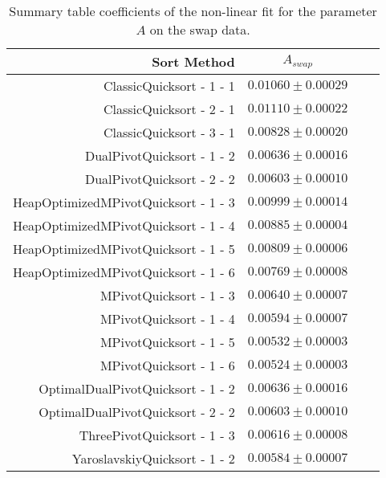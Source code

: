 


		\begin{table}
			\begin{center}
				\begin{tabular}{|r|c|c|c}
					\hline
									Sort Method              &   $A_{swap}$      \\ \hline \hline
					                ClassicQuicksort - 1 - 1 &   $0.01060 \pm  0.00029$ \\ \hline
					                ClassicQuicksort - 2 - 1 &   $0.01110 \pm  0.00022$ \\ \hline
					                ClassicQuicksort - 3 - 1 &   $0.00828 \pm  0.00020$ \\ \hline
					              DualPivotQuicksort - 1 - 2 &   $0.00636 \pm  0.00016$ \\ \hline
					              DualPivotQuicksort - 2 - 2 &   $0.00603 \pm  0.00010$ \\ \hline
					    HeapOptimizedMPivotQuicksort - 1 - 3 &   $0.00999 \pm  0.00014$ \\ \hline
					    HeapOptimizedMPivotQuicksort - 1 - 4 &   $0.00885 \pm  0.00004$ \\ \hline
					    HeapOptimizedMPivotQuicksort - 1 - 5 &   $0.00809 \pm  0.00006$ \\ \hline
					    HeapOptimizedMPivotQuicksort - 1 - 6 &   $0.00769 \pm  0.00008$ \\ \hline
					                 MPivotQuicksort - 1 - 3 &   $0.00640 \pm  0.00007$ \\ \hline
					                 MPivotQuicksort - 1 - 4 &   $0.00594 \pm  0.00007$ \\ \hline
					                 MPivotQuicksort - 1 - 5 &   $0.00532 \pm  0.00003$ \\ \hline
					                 MPivotQuicksort - 1 - 6 &   $0.00524 \pm  0.00003$ \\ \hline
					       OptimalDualPivotQuicksort - 1 - 2 &   $0.00636 \pm  0.00016$ \\ \hline
					       OptimalDualPivotQuicksort - 2 - 2 &   $0.00603 \pm  0.00010$ \\ \hline
					             ThreePivotQuicksort - 1 - 3 &   $0.00616 \pm  0.00008$ \\ \hline
					           YaroslavskiyQuicksort - 1 - 2 &   $0.00584 \pm  0.00007$ \\ \hline
				\end{tabular}
				\caption{Summary table coefficients of the non-linear fit for the parameter $A$ on the swap data.}
				\label{tab:swapFitCoeffA}
			\end{center}
		\end{table}


